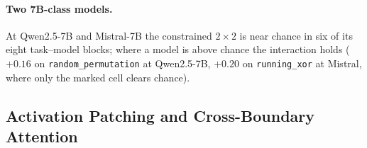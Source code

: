 \documentclass[10pt]{article} %
\newcommand{\task}[1]{\texttt{#1}}
\begin{document}
\paragraph{Two 7B-class models.} At Qwen2.5-7B and Mistral-7B the constrained $2\times2$ is near chance in six of its eight task--model blocks; where a model is above chance the interaction holds ($+0.16$ on \task{random\_permutation} at Qwen2.5-7B, $+0.20$ on \task{running\_xor} at Mistral, where only the marked cell clears chance).

\subsection{Activation Patching and Cross-Boundary Attention}
\label{sec:patching}
\end{document}

